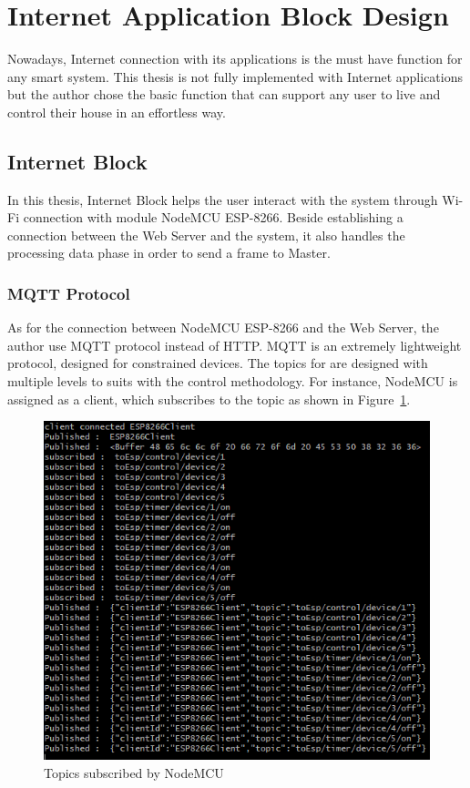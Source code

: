 \newpage
\section{Internet Application Block Design}
Nowadays, Internet connection with its applications is the must have function for any smart system. This thesis is not fully implemented with Internet applications but the author chose the basic function that can support any user to live and control their house in an effortless way.
    \subsection{Internet Block} %
    In this thesis, Internet Block helps the user interact with the system through Wi-Fi connection with module NodeMCU ESP-8266. Beside establishing a connection between the Web Server and the system, it also handles the processing data phase in order to send a frame to Master.
        \subsubsection{MQTT Protocol}
        As for the connection between NodeMCU ESP-8266 and the Web Server, the author use MQTT protocol instead of HTTP. MQTT is an extremely lightweight protocol, designed for constrained devices. The topics for are designed with multiple levels to suits with the control methodology. For instance, NodeMCU is assigned as a client, which subscribes to the topic as shown in Figure~\ref{fig:espSub}.
        \begin{figure}[!htb]
            \begin{center}
            \includegraphics[scale=0.9]{images/espSub.png}
            \caption{Topics subscribed by NodeMCU}
            \label{fig:espSub}
            \end{center}
        \end{figure}

